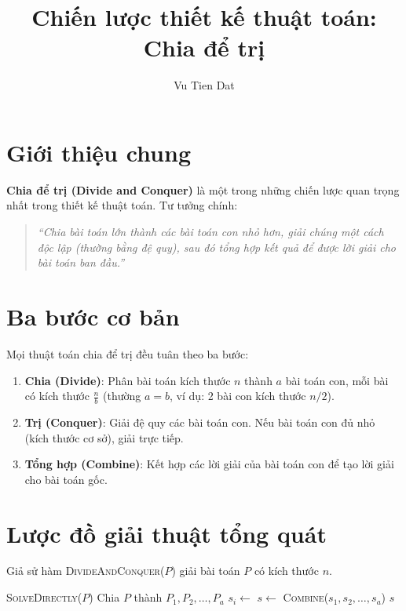 \documentclass{article}
\title{Chiến lược thiết kế thuật toán: \textbf{Chia để trị}}
\author{Vu Tien Dat}
\date{}
\begin{document}
\maketitle

\section{Giới thiệu chung}

\textbf{Chia để trị (Divide and Conquer)} là một trong những chiến lược quan trọng nhất trong thiết kế thuật toán. Tư tưởng chính: 

\begin{quote}
\itshape
``Chia bài toán lớn thành các bài toán con nhỏ hơn, giải chúng một cách độc lập (thường bằng đệ quy), sau đó tổng hợp kết quả để được lời giải cho bài toán ban đầu.''
\end{quote}

\section{Ba bước cơ bản}

Mọi thuật toán chia để trị đều tuân theo ba bước:

\begin{enumerate}
    \item \textbf{Chia (Divide)}: Phân bài toán kích thước \(n\) thành \(a\) bài toán con, mỗi bài có kích thước \(\frac{n}{b}\) (thường \(a = b\), ví dụ: 2 bài con kích thước \(n/2\)).
    \item \textbf{Trị (Conquer)}: Giải đệ quy các bài toán con. Nếu bài toán con đủ nhỏ (kích thước cơ sở), giải trực tiếp.
    \item \textbf{Tổng hợp (Combine)}: Kết hợp các lời giải của bài toán con để tạo lời giải cho bài toán gốc.
\end{enumerate}

\section{Lược đồ giải thuật tổng quát}

Giả sử hàm \textsc{DivideAndConquer}(\(P\)) giải bài toán \(P\) có kích thước \(n\).

\begin{algorithmic}[1]
     
        \State \Return \textsc{SolveDirectly}($P$)
    \Else
        \State Chia $P$ thành $P_1, P_2, \dots, P_a$ 
            \State $s_i \gets$  
        \EndFor
        \State $s \gets$ \textsc{Combine}($s_1, s_2, \dots, s_a$) 
        \State \Return $s$
    \EndIf
\EndFunction
\end{algorithmic}
\end{document}
